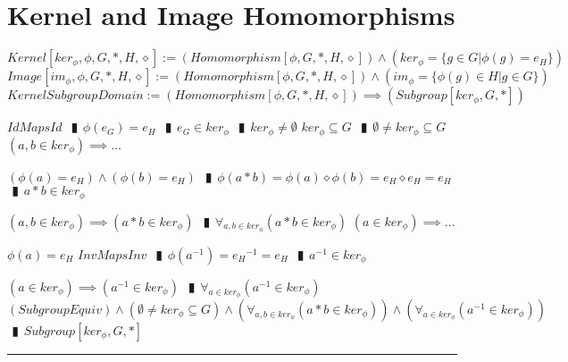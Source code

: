 \documentclass{book}
\newcommand{\abr}{:=}
\newcommand{\pipe}{$\phantom{(}\vrectangleblack\phantom{)}$}
\newcommand{\pr}[1]{\left(#1\right)}
\begin{document}
\section{Kernel and Image Homomorphisms}
$Kernel[ker_\phi, \phi, G, *, H, \diamond] \abr (Homomorphism[\phi, G, *, H, \diamond]) \land \pr{ker_\phi = \{g \in G | \phi(g) = e_H\}}$ \\
$Image[im_\phi, \phi, G, *, H, \diamond] \abr (Homomorphism[\phi, G, *, H, \diamond]) \land \pr{im_\phi = \{\phi(g) \in H | g \in G\}}$ \\

$KernelSubgroupDomain \abr (Homomorphism[\phi, G, *, H, \diamond]) \implies (Subgroup[ker_\phi, G, *])$
\begin{enumerate}
  \lit $IdMapsId$ \pipe $\phi(e_G) = e_H$ \pipe $e_G \in ker_\phi$ \pipe $ker_\phi \neq \emptyset$
  \lit $ker_\phi \subseteq G$ \pipe $\emptyset \neq ker_\phi \subseteq G$
  \lit $(a, b \in ker_\phi) \implies \ldots$
  \begin{enumerate}
    \lit $\pr{\phi(a) = e_H} \land \pr{\phi(b) = e_H}$ \pipe $\phi(a * b) = \phi(a) \diamond \phi(b) = e_H \diamond e_H = e_H$ \pipe $a * b \in ker_\phi$
  \end{enumerate}
  \lit $(a, b \in ker_\phi) \implies (a * b \in ker_\phi)$ \pipe $\forall_{a, b \in ker_\phi}(a * b \in ker_\phi)$
  \lit $(a \in ker_\phi) \implies \ldots$
  \begin{enumerate}
    \lit $\phi(a) = e_H$
    \lit $InvMapsInv$ \pipe $\phi(a^{-1}) = {e_H}^{-1} = e_H$ \pipe $a^{-1} \in ker_\phi$
  \end{enumerate}
  \lit $(a \in ker_\phi) \implies (a^{-1} \in ker_\phi)$ \pipe $\forall_{a \in ker_\phi}(a^{-1} \in ker_\phi)$
  \lit $(SubgroupEquiv) \land (\emptyset \neq ker_\phi \subseteq G) \land \pr{\forall_{a, b \in ker_\phi}(a * b \in ker_\phi)} \land \pr{\forall_{a \in ker_\phi}(a^{-1} \in ker_\phi)}$ \pipe $Subgroup[ker_\phi, G, *]$
\end{enumerate} \vspace{.75mm} \hrule \vspace{.75mm} \ \\ 
\end{document}
